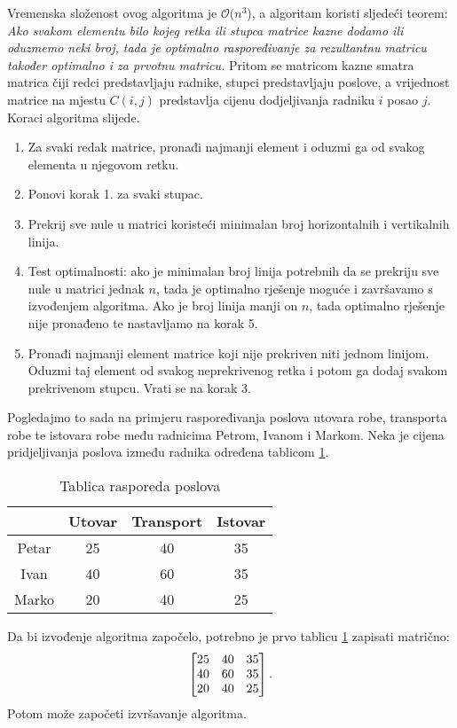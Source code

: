 \documentclass[times, utf8, zavrsni]{fer}
\begin{document}
Vremenska složenost ovog algoritma je $\mathcal{O}(n^3$), a algoritam koristi sljedeći teorem:
\emph{Ako svakom elementu bilo kojeg retka ili stupca matrice kazne dodamo ili oduzmemo neki broj, tada je optimalno raspoređivanje za rezultantnu matricu također optimalno i za prvotnu matricu.} Pritom se matricom kazne smatra matrica čiji redci predstavljaju radnike, stupci predstavljaju poslove, a vrijednost matrice na mjestu $C(i, j)$ predstavlja cijenu dodjeljivanja radniku $i$ posao $j$.
Koraci algoritma slijede.
\begin{enumerate}
  \item Za svaki redak matrice, pronađi najmanji element i oduzmi ga od svakog elementa u njegovom retku.
  \item Ponovi korak 1. za svaki stupac.
  \item Prekrij sve nule u matrici koristeći minimalan broj horizontalnih i vertikalnih linija.
  \item Test optimalnosti: ako je minimalan broj linija potrebnih da se prekriju sve nule u matrici jednak $n$, tada je optimalno rješenje moguće
  i završavamo s izvođenjem algoritma. Ako je broj linija manji on $n$, tada optimalno rješenje nije pronađeno te nastavljamo na korak 5.
  \item Pronađi najmanji element matrice koji nije prekriven niti jednom linijom. Oduzmi taj element od svakog neprekrivenog
  retka i potom ga dodaj svakom prekrivenom stupcu. Vrati se na korak 3.
\end{enumerate}


Pogledajmo to sada na primjeru raspoređivanja poslova utovara robe, transporta robe te istovara robe među radnicima Petrom, Ivanom i Markom.
Neka je cijena pridjeljivanja poslova između radnika određena tablicom \ref{tbl:poslovi}.
\begin{table}[h!]
  \caption{Tablica rasporeda poslova}
  \label{tbl:poslovi}
  \centering
  \begin{tabular}{c | c | c | c}
          & Utovar & Transport & Istovar \\ \hline
    Petar & 25     & 40        & 35      \\ \hline
    Ivan  & 40     & 60        & 35      \\ \hline
    Marko & 20     & 40        & 25
  \end{tabular}
\end{table}

\noindent Da bi izvođenje algoritma započelo, potrebno je prvo tablicu \ref{tbl:poslovi} zapisati matrično:
$$
\begin{bmatrix}
  \centering
  25 & 40 & 35 \\
  40 & 60 & 35 \\
  20 & 40 & 25
\end{bmatrix}.
$$
Potom može započeti izvršavanje algoritma.
\end{document}
